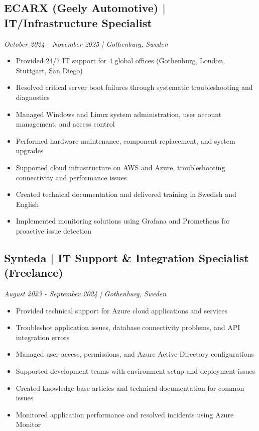 \documentclass[11pt,a4paper]{article}
\begin{document}
\subsection*{ECARX (Geely Automotive) | IT/Infrastructure Specialist}
\textit{October 2024 - November 2025 | Gothenburg, Sweden}
\begin{itemize}[noitemsep]
\item Provided 24/7 IT support for 4 global offices (Gothenburg, London, Stuttgart, San Diego)
\item Resolved critical server boot failures through systematic troubleshooting and diagnostics
\item Managed Windows and Linux system administration, user account management, and access control
\item Performed hardware maintenance, component replacement, and system upgrades
\item Supported cloud infrastructure on AWS and Azure, troubleshooting connectivity and performance issues
\item Created technical documentation and delivered training in Swedish and English
\item Implemented monitoring solutions using Grafana and Prometheus for proactive issue detection
\end{itemize}

\subsection*{Synteda | IT Support \& Integration Specialist (Freelance)}
\textit{August 2023 - September 2024 | Gothenburg, Sweden}
\begin{itemize}[noitemsep]
\item Provided technical support for Azure cloud applications and services
\item Troubleshot application issues, database connectivity problems, and API integration errors
\item Managed user access, permissions, and Azure Active Directory configurations
\item Supported development teams with environment setup and deployment issues
\item Created knowledge base articles and technical documentation for common issues
\item Monitored application performance and resolved incidents using Azure Monitor
\end{itemize}
\end{document}
